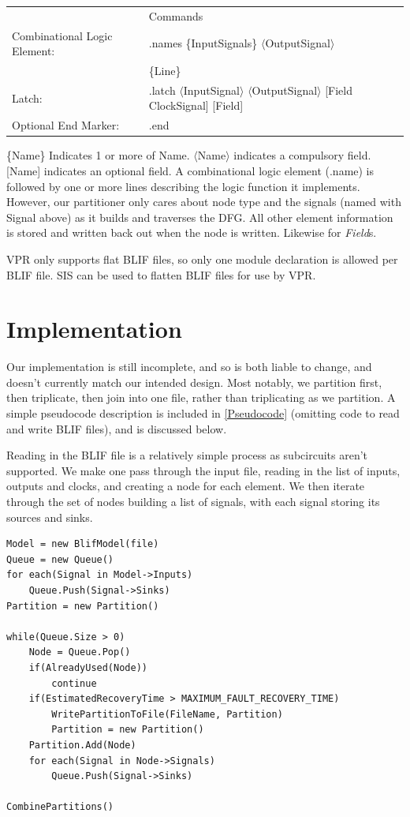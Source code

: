 \documentclass[12pt,drafta4paper,oneside]{memoir} %
\begin{document}
\begin{tabular}{lll}
    &Commands&\\
    Combinational Logic Element: & .names \{InputSignals\} $\langle$OutputSignal$\rangle$\\
     &\{Line\}&\\
    Latch: & .latch $\langle$InputSignal$\rangle$ $\langle$OutputSignal$\rangle$ [Field ClockSignal] [Field]&\\
    Optional End Marker: & .end
\end{tabular}
\{Name\} Indicates 1 or more of Name. $\langle$Name$\rangle$ indicates a compulsory field. [Name] indicates an optional field.
A combinational logic element (.name) is followed by one or more lines describing the logic function it implements. However, our partitioner only cares about node type and the signals (named with Signal above) as it builds and traverses the \ac{DFG}. All other element information is stored and written back out when the node is written. Likewise for \emph{Field}s.

\ac{VPR} only supports flat \ac{BLIF} files, so only one module declaration is allowed per \ac{BLIF} file. \ac{SIS} can be used to flatten \ac{BLIF} files for use by \ac{VPR}.

\section{Implementation}
Our implementation is still incomplete, and so is both liable to change, and doesn't currently match our intended design. Most notably, we partition first, then triplicate, then join into one file, rather than triplicating as we partition. A simple pseudocode description is included in \ref{Pseudocode} (omitting code to read and write \ac{BLIF} files), and is discussed below.

Reading in the \ac{BLIF} file is a relatively simple process as subcircuits aren't supported. We make one pass through the input file, reading in the list of inputs, outputs and clocks, and creating a node for each element. We then iterate through the set of nodes building a list of signals, with each signal storing its sources and sinks.

\begin{lstlisting}[caption=Simplified Pseudocode,label=Pseudocode]
Model = new BlifModel(file)
Queue = new Queue()
for each(Signal in Model->Inputs)
    Queue.Push(Signal->Sinks)
Partition = new Partition()

while(Queue.Size > 0)
    Node = Queue.Pop()
    if(AlreadyUsed(Node))
        continue
    if(EstimatedRecoveryTime > MAXIMUM_FAULT_RECOVERY_TIME)
        WritePartitionToFile(FileName, Partition)
        Partition = new Partition()
    Partition.Add(Node)
    for each(Signal in Node->Signals)
        Queue.Push(Signal->Sinks)
        
CombinePartitions()
\end{lstlisting}
\end{document}
